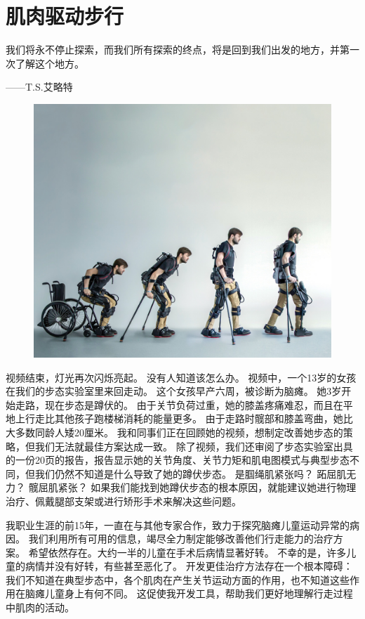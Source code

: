 \chapter{肌肉驱动步行} \label{chap:chap11}

我们将永不停止探索，而我们所有探索的终点，将是回到我们出发的地方，并第一次了解这个地方。
\begin{flushright}
	——T.S.艾略特
\end{flushright}


\begin{figure}[!htb]
	\centering
	\includegraphics[width=1.0\linewidth]{chap11/11_0}
	\caption*{ \label{fig:11_0}}
\end{figure}


视频结束，灯光再次闪烁亮起。
没有人知道该怎么办。
视频中，一个13岁的女孩在我们的步态实验室里来回走动。
这个女孩早产六周，被诊断为脑瘫。
她3岁开始走路，现在步态是蹲伏的。
由于关节负荷过重，她的膝盖疼痛难忍，而且在平地上行走比其他孩子跑楼梯消耗的能量更多。
由于走路时髋部和膝盖弯曲，她比大多数同龄人矮20厘米。
我和同事们正在回顾她的视频，想制定改善她步态的策略，但我们无法就最佳方案达成一致。
除了视频，我们还审阅了步态实验室出具的一份20页的报告，报告显示她的关节角度、关节力矩​​和肌电图模式与典型步态不同，但我们仍然不知道是什么导致了她的蹲伏步态。
是腘绳肌紧张吗？
跖屈肌无力？
髋屈肌紧张？
如果我们能找到她蹲伏步态的根本原因，就能建议她进行物理治疗、佩戴腿部支架或进行矫形手术来解决这些问题。


我职业生涯的前15年，一直在与其他专家合作，致力于探究脑瘫儿童运动异常的病因。
我们利用所有可用的信息，竭尽全力制定能够改善他们行走能力的治疗方案。
希望依然存在。大约一半的儿童在手术后病情显著好转。
不幸的是，许多儿童的病情并没有好转，有些甚至恶化了。
开发更佳治疗方法存在一个根本障碍：我们不知道在典型步态中，各个肌肉在产生关节运动方面的作用，也不知道这些作用在脑瘫儿童身上有何不同。
这促使我开发工具，帮助我们更好地理解行走过程中肌肉的活动。


